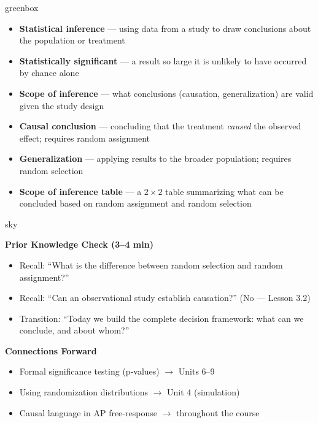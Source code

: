 \documentclass[10pt]{article}
\begin{document}
\begin{skillbox}{greenbox}
\begin{minipage}[t]{0.48\linewidth}
    \begin{itemize}
        \item \textbf{Statistical inference} --- using data from a study to draw
              conclusions about the population or treatment
        \item \textbf{Statistically significant} --- a result so large it is unlikely
              to have occurred by chance alone
        \item \textbf{Scope of inference} --- what conclusions (causation,
              generalization) are valid given the study design
    \end{itemize}
\end{minipage}
\hfill
\begin{minipage}[t]{0.48\linewidth}
    \begin{itemize}
        \item \textbf{Causal conclusion} --- concluding that the treatment \emph{caused}
              the observed effect; requires random assignment
        \item \textbf{Generalization} --- applying results to the broader population;
              requires random selection
        \item \textbf{Scope of inference table} --- a $2 \times 2$ table summarizing
              what can be concluded based on random assignment and random selection
    \end{itemize}
\end{minipage}
\end{skillbox}

\begin{skillbox}{sky}
\begin{minipage}[t]{0.48\linewidth}
    \textbf{Prior Knowledge Check (3--4 min)}
    \begin{itemize}
        \item Recall: ``What is the difference between random selection and random
              assignment?''
        \item Recall: ``Can an observational study establish causation?'' (No ---
              Lesson 3.2)
        \item Transition: ``Today we build the complete decision framework: what can
              we conclude, and about whom?''
    \end{itemize}
\end{minipage}
\hfill
\begin{minipage}[t]{0.48\linewidth}
    \textbf{Connections Forward}
    \begin{itemize}
        \item Formal significance testing (p-values) $\to$ Units 6--9
        \item Using randomization distributions $\to$ Unit 4 (simulation)
        \item Causal language in AP free-response $\to$ throughout the course
    \end{itemize}
\end{minipage}
\end{skillbox}
\end{document}
